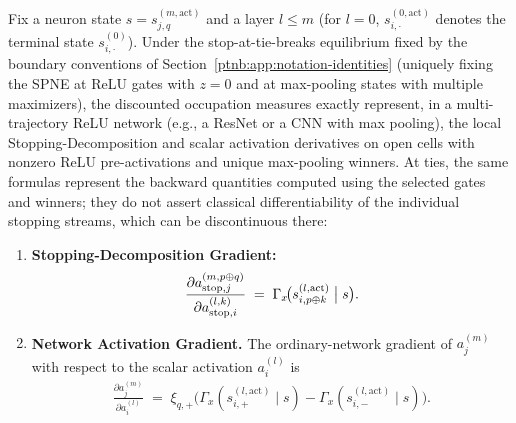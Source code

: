 \begin{theoremenv}\label{ptnb:thm:deriv-occ}\label{thm:gradient_occupation}
Fix a neuron state $s = s_{j,q}^{(m, \mathrm{act})}$ and a layer $l \le m$ (for $l = 0$,
$s_{i,\cdot}^{(0,\mathrm{act})}$ denotes the terminal state $s_{i,\cdot}^{(0)}$). Under the
stop-at-tie-breaks equilibrium fixed by the boundary conventions of
Section~\ref{ptnb:app:notation-identities} (uniquely fixing the SPNE at ReLU gates with $z = 0$ and at
max-pooling states with multiple maximizers), the discounted occupation measures exactly represent,
in a multi-trajectory ReLU network (e.g., a ResNet or a CNN with max pooling), the local
Stopping-Decomposition and scalar activation derivatives on open cells with nonzero ReLU pre-activations and unique max-pooling winners. At ties, the same formulas represent the backward quantities computed using the selected gates and winners; they do not assert classical differentiability of the individual stopping streams, which can be discontinuous there:
\begin{enumerate}
    \item \textbf{Stopping-Decomposition Gradient:}
        \begin{align}
            \frac{\partial a_{\mathrm{stop},j}^{(m, p \oplus q)}}{\partial a_{\mathrm{stop},i}^{(l, k)}}
            \;=\;
            \Gamma_x\!\bigl(s_{i, p \oplus k}^{(l, \mathrm{act})} \bigm| s\bigr).
        \end{align}
    \item \textbf{Network Activation Gradient.} The ordinary-network gradient of $a_j^{(m)}$ with respect to
        the scalar activation $a_i^{(l)}$ is
        \begin{align}
            \frac{\partial a_j^{(m)}}{\partial a_i^{(l)}}
            \;=\;
            \xi_{q, +}\bigl(\Gamma_x(s_{i, +}^{(l, \mathrm{act})} \mid s) - \Gamma_x(s_{i, -}^{(l,
            \mathrm{act})} \mid s)\bigr).
        \end{align}
\end{enumerate}\end{theoremenv}


